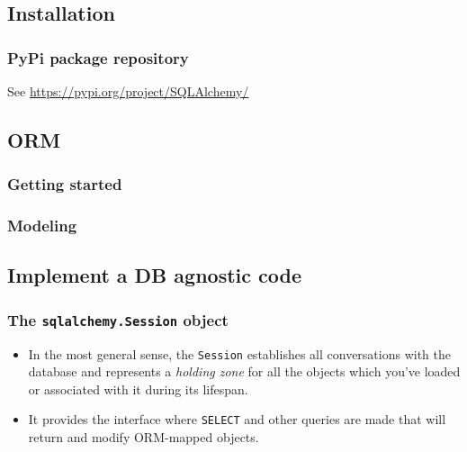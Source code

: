 \documentclass[english]{beamer}
\newcommand{\PROGRAMDIR}{data}
\begin{document}
\subsection{Installation}
\begin{frame}[containsverbatim]
    \frametitle{PyPi package repository}
    \lstset{basicstyle=\tiny\ttfamily,language=sh,numbers=left}
    
    See \url{https://pypi.org/project/SQLAlchemy/}
\end{frame}

\subsection{\gls{ORM}}
\begin{frame}[containsverbatim]
    \frametitle{Getting started}
    \lstset{basicstyle=\tiny\ttfamily,language=Python,numbers=left}
    
\end{frame}
\begin{frame}[containsverbatim]
    \frametitle{Modeling}
    \lstset{basicstyle=\tiny\ttfamily,language=Python,numbers=left}
    
\end{frame}

\subsection{Implement a DB agnostic code}
\begin{frame}
    \frametitle{The \texttt{sqlalchemy.Session} object}
    \begin{itemize}
    \item In the most general sense, the \texttt{Session} establishes
        all conversations with the database and represents a
        \emph{holding zone} for all the objects which you've loaded or
        associated with it during its lifespan.
    \item It provides the interface where \texttt{SELECT} and other
        queries are made that will return and modify \gls{ORM}-mapped
        objects.
    \end{itemize}
\end{frame}
\begin{frame}
    \lstset{basicstyle=\tiny\ttfamily,language=Python,numbers=left}
    
\end{frame}
\end{document}
